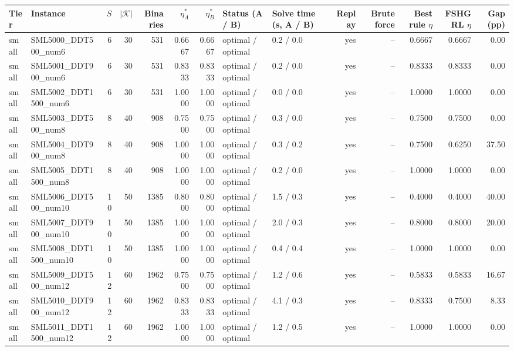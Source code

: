\begin{tabular}{llrrrrrllrrrrr}
\toprule
Tier & Instance & $S$ & $|\mathcal{K}|$ & Binaries & $\eta^*_{A}$ & $\eta^*_{B}$ & Status (A / B) & Solve time (s, A / B) & Replay & Brute force & Best rule $\eta$ & FSHGRL $\eta$ & Gap (pp) \\
\midrule
small & SML5000\_DDT500\_num6 & 6 & 30 & 531 & 0.6667 & 0.6667 & optimal / optimal & 0.2 / 0.0 & yes & -- & 0.6667 & 0.6667 & 0.00 \\
small & SML5001\_DDT900\_num6 & 6 & 30 & 531 & 0.8333 & 0.8333 & optimal / optimal & 0.2 / 0.0 & yes & -- & 0.8333 & 0.8333 & 0.00 \\
small & SML5002\_DDT1500\_num6 & 6 & 30 & 531 & 1.0000 & 1.0000 & optimal / optimal & 0.0 / 0.0 & yes & -- & 1.0000 & 1.0000 & 0.00 \\
small & SML5003\_DDT500\_num8 & 8 & 40 & 908 & 0.7500 & 0.7500 & optimal / optimal & 0.3 / 0.0 & yes & -- & 0.7500 & 0.7500 & 0.00 \\
small & SML5004\_DDT900\_num8 & 8 & 40 & 908 & 1.0000 & 1.0000 & optimal / optimal & 0.3 / 0.2 & yes & -- & 0.7500 & 0.6250 & 37.50 \\
small & SML5005\_DDT1500\_num8 & 8 & 40 & 908 & 1.0000 & 1.0000 & optimal / optimal & 0.2 / 0.0 & yes & -- & 1.0000 & 1.0000 & 0.00 \\
small & SML5006\_DDT500\_num10 & 10 & 50 & 1385 & 0.8000 & 0.8000 & optimal / optimal & 1.5 / 0.3 & yes & -- & 0.4000 & 0.4000 & 40.00 \\
small & SML5007\_DDT900\_num10 & 10 & 50 & 1385 & 1.0000 & 1.0000 & optimal / optimal & 2.0 / 0.3 & yes & -- & 0.8000 & 0.8000 & 20.00 \\
small & SML5008\_DDT1500\_num10 & 10 & 50 & 1385 & 1.0000 & 1.0000 & optimal / optimal & 0.4 / 0.4 & yes & -- & 1.0000 & 1.0000 & 0.00 \\
small & SML5009\_DDT500\_num12 & 12 & 60 & 1962 & 0.7500 & 0.7500 & optimal / optimal & 1.2 / 0.6 & yes & -- & 0.5833 & 0.5833 & 16.67 \\
small & SML5010\_DDT900\_num12 & 12 & 60 & 1962 & 0.8333 & 0.8333 & optimal / optimal & 4.1 / 0.3 & yes & -- & 0.8333 & 0.7500 & 8.33 \\
small & SML5011\_DDT1500\_num12 & 12 & 60 & 1962 & 1.0000 & 1.0000 & optimal / optimal & 1.2 / 0.5 & yes & -- & 1.0000 & 1.0000 & 0.00 \\
\bottomrule
\end{tabular}
